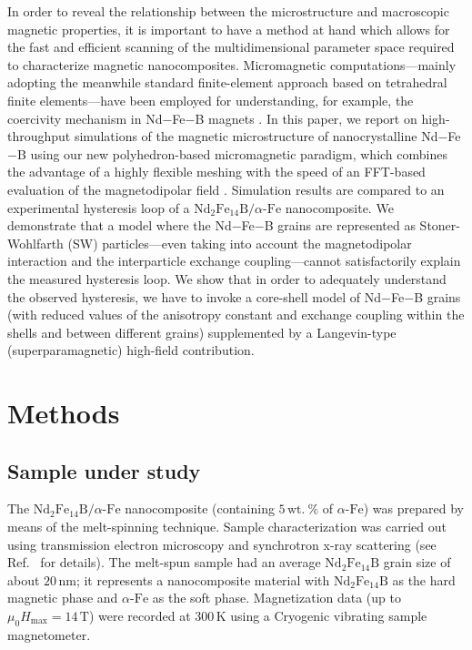 \documentclass[prm,twocolumn,showkeys,preprintnumbers,amsmath,amssymb,superscriptaddress,aps,10pt]{revtex4-1}
\begin{document}
In order to reveal the relationship between the microstructure and macroscopic magnetic properties, it is important to have a method at hand which allows for the fast and efficient scanning of the multidimensional parameter space required to characterize magnetic nanocomposites. Micromagnetic computations---mainly adopting the meanwhile standard finite-element approach based on tetrahedral finite elements---have been employed for understanding, for example, the coercivity mechanism in Nd$-$Fe$-$B magnets \cite{schrefl94,fischer96,fischer98,fukunaga2001,Gao2003,He2012,Saiden2014,hrkac2014,fujisaki2014,Yi2016}. In this paper, we report on high-throughput simulations of the magnetic microstructure of nanocrystalline Nd$-$Fe$-$B using our new polyhedron-based micromagnetic paradigm, which combines the advantage of a highly flexible meshing with the speed of an FFT-based evaluation of the magnetodipolar field \cite{erokhin2012prb,michels2012prb1,michels2014jmmm,erokhin2015}. Simulation results are compared to an experimental hysteresis loop of a $\mathrm{Nd}_2\mathrm{Fe}_{14}\mathrm{B} / \alpha$-$\mathrm{Fe}$ nanocomposite. We demonstrate that a model where the Nd$-$Fe$-$B grains are represented as Stoner-Wohlfarth (SW) particles---even taking into account the magnetodipolar interaction and the interparticle exchange coupling---cannot satisfactorily explain the measured hysteresis loop. We show that in order to adequately understand the observed hysteresis, we have to invoke a core-shell model of Nd$-$Fe$-$B grains (with reduced values of the anisotropy constant and exchange coupling within the shells and between different grains) supplemented by a Langevin-type (superparamagnetic) high-field contribution.

\section{Methods \label{methods}}

\subsection{Sample under study \label{sample}}

The $\mathrm{Nd}_2\mathrm{Fe}_{14}\mathrm{B}/\alpha$-$\mathrm{Fe}$ nanocomposite (containing $5 \, \mathrm{wt.~\%}$ of $\alpha$-$\mathrm{Fe}$) was prepared by means of the melt-spinning technique. Sample characterization was carried out using transmission electron microscopy and synchrotron x-ray scattering (see Ref.~ for details). The melt-spun sample had an average $\mathrm{Nd}_2\mathrm{Fe}_{14}\mathrm{B}$ grain size of about $20 \, \mathrm{nm}$; it represents a nanocomposite material with $\mathrm{Nd}_2\mathrm{Fe}_{14}\mathrm{B}$ as the hard magnetic phase and $\alpha$-$\mathrm{Fe}$ as the soft phase. Magnetization data (up to $\mu_0 H_{\mathrm{max}} = 14 \, \mathrm{T}$) were recorded at $300 \, \mathrm{K}$ using a Cryogenic vibrating sample magnetometer.
\end{document}

